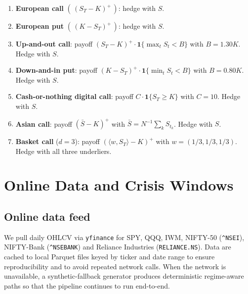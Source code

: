 \documentclass[11pt,a4paper]{article}
\begin{document}
\begin{enumerate}[leftmargin=*]
\item \textbf{European call} $(\,(S_T-K)^+\,)$: hedge with $S$.
\item \textbf{European put} $(\,(K-S_T)^+\,)$: hedge with $S$.
\item \textbf{Up-and-out call}: payoff $(S_T-K)^+\cdot\mathbf{1}\{\max_t S_t<B\}$
  with $B=1.30K$. Hedge with $S$.
\item \textbf{Down-and-in put}: payoff $(K-S_T)^+\cdot\mathbf{1}\{\min_t S_t<B\}$
  with $B=0.80K$. Hedge with $S$.
\item \textbf{Cash-or-nothing digital call}: payoff $C\cdot\mathbf{1}\{S_T\ge K\}$
  with $C=10$.  Hedge with $S$.
\item \textbf{Asian call}: payoff $(\bar S - K)^+$ with $\bar S = N^{-1}\sum_k S_{t_k}$.
  Hedge with $S$.
\item \textbf{Basket call} ($d=3$): payoff $(\langle w, S_T\rangle - K)^+$
  with $w = (1/3,1/3,1/3)$.  Hedge with all three underliers.
\end{enumerate}

\section{Online Data and Crisis Windows}\label{sec:data}

\subsection{Online data feed}

We pull daily OHLCV via \texttt{yfinance} for SPY, QQQ, IWM, NIFTY-50
(\texttt{\^{}NSEI}), NIFTY-Bank (\texttt{\^{}NSEBANK}) and Reliance Industries
(\texttt{RELIANCE.NS}).  Data are cached to local Parquet files keyed by
ticker and date range to ensure reproducibility and to avoid repeated
network calls.  When the network is unavailable, a synthetic-fallback
generator produces deterministic regime-aware paths so that the pipeline
continues to run end-to-end.
\end{document}
